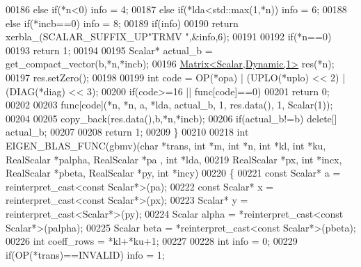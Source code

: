 \begin{DoxyCode}
00186   \textcolor{keywordflow}{else} \textcolor{keywordflow}{if}(*n<0)                                                       info = 4;
00187   \textcolor{keywordflow}{else} \textcolor{keywordflow}{if}(*lda<std::max(1,*n))                                        info = 6;
00188   \textcolor{keywordflow}{else} \textcolor{keywordflow}{if}(*incb==0)                                                   info = 8;
00189   \textcolor{keywordflow}{if}(info)
00190     \textcolor{keywordflow}{return} xerbla\_(SCALAR\_SUFFIX\_UP\textcolor{stringliteral}{"TRMV "},&info,6);
00191 
00192   \textcolor{keywordflow}{if}(*n==0)
00193     \textcolor{keywordflow}{return} 1;
00194 
00195   Scalar* actual\_b = get\_compact\_vector(b,*n,*incb);
00196   \hyperlink{group___core___module}{Matrix<Scalar,Dynamic,1>} res(*n);
00197   res.setZero();
00198 
00199   \textcolor{keywordtype}{int} code = OP(*opa) | (UPLO(*uplo) << 2) | (DIAG(*diag) << 3);
00200   \textcolor{keywordflow}{if}(code>=16 || func[code]==0)
00201     \textcolor{keywordflow}{return} 0;
00202 
00203   func[code](*n, *n, a, *lda, actual\_b, 1, res.data(), 1, Scalar(1));
00204 
00205   copy\_back(res.data(),b,*n,*incb);
00206   \textcolor{keywordflow}{if}(actual\_b!=b) \textcolor{keyword}{delete}[] actual\_b;
00207 
00208   \textcolor{keywordflow}{return} 1;
00209 \}
00210 
00218 \textcolor{keywordtype}{int} EIGEN\_BLAS\_FUNC(gbmv)(\textcolor{keywordtype}{char} *trans, \textcolor{keywordtype}{int} *m, \textcolor{keywordtype}{int} *n, \textcolor{keywordtype}{int} *kl, \textcolor{keywordtype}{int} *ku, RealScalar *palpha, RealScalar *pa
      , \textcolor{keywordtype}{int} *lda,
00219                           RealScalar *px, \textcolor{keywordtype}{int} *incx, RealScalar *pbeta, RealScalar *py, \textcolor{keywordtype}{int} *incy)
00220 \{
00221   \textcolor{keyword}{const} Scalar* a = \textcolor{keyword}{reinterpret\_cast<}\textcolor{keyword}{const }Scalar*\textcolor{keyword}{>}(pa);
00222   \textcolor{keyword}{const} Scalar* x = \textcolor{keyword}{reinterpret\_cast<}\textcolor{keyword}{const }Scalar*\textcolor{keyword}{>}(px);
00223   Scalar* y = \textcolor{keyword}{reinterpret\_cast<}Scalar*\textcolor{keyword}{>}(py);
00224   Scalar alpha = *\textcolor{keyword}{reinterpret\_cast<}\textcolor{keyword}{const }Scalar*\textcolor{keyword}{>}(palpha);
00225   Scalar beta = *\textcolor{keyword}{reinterpret\_cast<}\textcolor{keyword}{const }Scalar*\textcolor{keyword}{>}(pbeta);
00226   \textcolor{keywordtype}{int} coeff\_rows = *kl+*ku+1;
00227 
00228   \textcolor{keywordtype}{int} info = 0;
00229        \textcolor{keywordflow}{if}(OP(*trans)==INVALID)                                        info = 1;

\end{DoxyCode}
